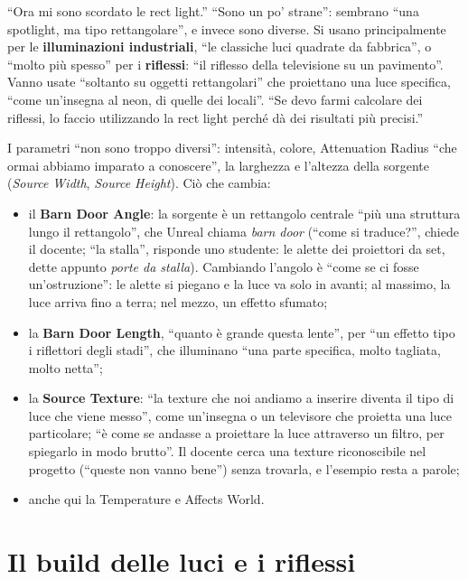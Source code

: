 ``Ora mi sono scordato le rect light.'' ``Sono un po' strane'': sembrano ``una spotlight,
ma tipo rettangolare'', e invece sono diverse. Si usano principalmente per le
\textbf{illuminazioni industriali}, ``le classiche luci quadrate da fabbrica'', o ``molto
più spesso'' per i \textbf{riflessi}: ``il riflesso della televisione su un pavimento''.
Vanno usate ``soltanto su oggetti rettangolari'' che proiettano una luce specifica, ``come
un'insegna al neon, di quelle dei locali''. ``Se devo farmi calcolare dei riflessi, lo
faccio utilizzando la rect light perché dà dei risultati più precisi.''

I parametri ``non sono troppo diversi'': intensità, colore, Attenuation Radius ``che ormai
abbiamo imparato a conoscere'', la larghezza e l'altezza della sorgente (\emph{Source Width},
\emph{Source Height}). Ciò che cambia:
\begin{itemize}
  \item il \textbf{Barn Door Angle}: la sorgente è un rettangolo centrale ``più una
        struttura lungo il rettangolo'', che Unreal chiama \emph{barn door} (``come si
        traduce?'', chiede il docente; ``la stalla'', risponde uno studente: le alette dei
        proiettori da set, dette appunto \emph{porte da stalla}). Cambiando l'angolo è
        ``come se ci fosse un'ostruzione'': le alette si piegano e la luce va solo in avanti;
        al massimo, la luce arriva fino a terra; nel mezzo, un effetto sfumato;
  \item la \textbf{Barn Door Length}, ``quanto è grande questa lente'', per ``un effetto tipo
        i riflettori degli stadi'', che illuminano ``una parte specifica, molto tagliata,
        molto netta'';
  \item la \textbf{Source Texture}: ``la texture che noi andiamo a inserire diventa il tipo di
        luce che viene messo'', come un'insegna o un televisore che proietta una luce
        particolare; ``è come se andasse a proiettare la luce attraverso un filtro, per
        spiegarlo in modo brutto''. Il docente cerca una texture riconoscibile nel progetto
        (``queste non vanno bene'') senza trovarla, e l'esempio resta a parole;
  \item anche qui la Temperature e Affects World.
\end{itemize}

\section{Il build delle luci e i riflessi}
\label{ue13:sec:build}

